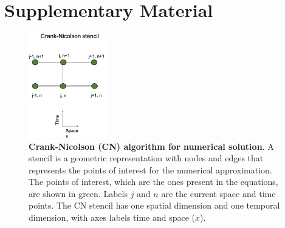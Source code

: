 \section{Supplementary Material}
\newcommand{\beginsupplement}{%
    \setcounter{table}{0}
    \renewcommand{\thetable}{S\arabic{table}}%
    \setcounter{figure}{0}
    \renewcommand{\thefigure}{S\arabic{figure}}%
}
\beginsupplement

\begin{figure}[!ht]
    \center
    \includegraphics[width=0.3\textwidth]{figures/stencils}

    \caption{\textbf{Crank-Nicolson (CN) algorithm for numerical solution}. A stencil is a geometric representation with nodes and edges that represents the points of interest for the numerical approximation. The points of interest, which are the ones present in the equations, are shown in green. Labels $j$ and $n$ are the current space and time points. The CN stencil has one spatial dimension and one temporal dimension, with axes labels time and space ($x$). }   \label{sup_fig1}
\end{figure}


